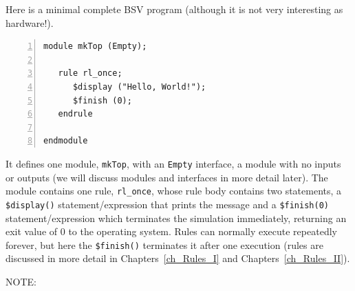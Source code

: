 Here is a minimal complete BSV program (although it is not very
interesting as hardware!).


{\small
\begin{Verbatim}[frame=single, numbers=left, label=in file Exercises/Ex\_03\_A/Top.bsv]
module mkTop (Empty);

   rule rl_once;
      $display ("Hello, World!");
      $finish (0);
   endrule
      
endmodule
\end{Verbatim}
}

It defines one module, \verb|mkTop|, with an \verb|Empty| interface,
{\ie} a module with no inputs or outputs (we will discuss modules and
interfaces in more detail later).  The module contains one rule,
\verb|rl_once|, whose rule body contains two statements, a
\verb|$display()| statement/expression that prints the message and a
\verb|$finish(0)| statement/expression which terminates the simulation
immediately, returning an exit value of 0 to the operating system.
Rules can normally execute repeatedly forever, but here the
\verb|$finish()| terminates it after one execution (rules are
discussed in more detail in Chapters~\ref{ch_Rules_I} and
Chapters~\ref{ch_Rules_II}).

\vspace{1ex}

NOTE:


